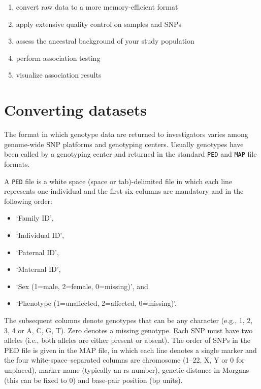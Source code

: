 \documentclass[
]{book}
\newcommand{\passthrough}[1]{#1}
\providecommand{\tightlist}{%
  \setlength{\itemsep}{0pt}\setlength{\parskip}{0pt}}
\begin{document}
\begin{enumerate}
\def\labelenumi{\arabic{enumi}.}
\tightlist
\item
  convert raw data to a more memory-efficient format
\item
  apply extensive quality control on samples and SNPs
\item
  assess the ancestral background of your study population
\item
  perform association testing
\item
  visualize association results
\end{enumerate}

\hypertarget{converting-datasets}{%
\section{Converting datasets}\label{converting-datasets}}

The format in which genotype data are returned to investigators varies among genome-wide SNP platforms and genotyping centers. Usually genotypes have been called by a genotyping center and returned in the standard \passthrough{\lstinline!PED!} and \passthrough{\lstinline!MAP!} file formats.

A \passthrough{\lstinline!PED!} file is a white space (space or tab)-delimited file in which each line represents one individual and the first six columns are mandatory and in the following order:

\begin{itemize}
\tightlist
\item
  `Family ID',
\item
  `Individual ID',
\item
  `Paternal ID',
\item
  `Maternal ID',
\item
  `Sex (1=male, 2=female, 0=missing)', and
\item
  `Phenotype (1=unaffected, 2=affected, 0=missing)'.
\end{itemize}

The subsequent columns denote genotypes that can be any character (e.g., 1, 2, 3, 4 or A, C, G, T). Zero denotes a missing genotype. Each SNP must have two alleles (i.e., both alleles are either present or absent).
The order of SNPs in the PED file is given in the MAP file, in which each line denotes a single marker and the four white-space--separated columns are chromosome (1--22, X, Y or 0 for unplaced), marker name (typically an rs number), genetic distance in Morgans (this can be fixed to 0) and base-pair position (bp units).
\end{document}
